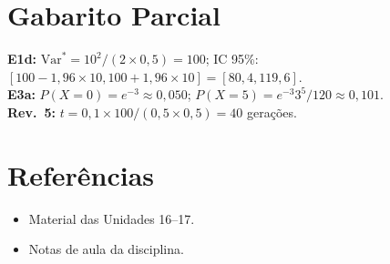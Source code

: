 \documentclass[12pt,a4paper]{article}
\begin{document}
\section*{Gabarito Parcial}
\textbf{E1d:} $\text{Var}^* = 10^2/(2\times0{,}5) = 100$; IC 95\%: $[100-1{,}96\times10, 100+1{,}96\times10] = [80{,}4, 119{,}6]$.\\
\textbf{E3a:} $P(X=0) = e^{-3} \approx 0{,}050$; $P(X=5) = e^{-3}3^5/120 \approx 0{,}101$.\\
\textbf{Rev.\ 5:} $t = 0{,}1 \times 100 / (0{,}5\times0{,}5) = 40$ gera\c{c}\~oes.

\section*{Refer\^encias}
\begin{itemize}
  \item Material das Unidades 16--17.
  \item Notas de aula da disciplina.
\end{itemize}
\end{document}
